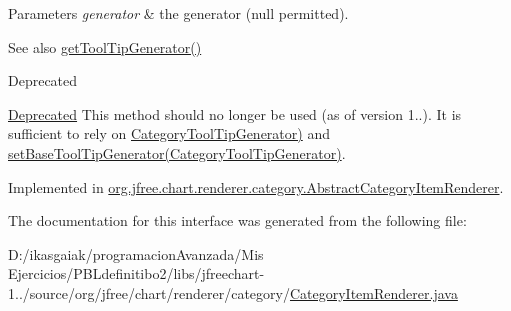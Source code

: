 \begin{DoxyParams}{Parameters}
{\em generator} & the generator ({\ttfamily null} permitted).\\
\hline
\end{DoxyParams}
\begin{DoxySeeAlso}{See also}
\mbox{\hyperlink{interfaceorg_1_1jfree_1_1chart_1_1renderer_1_1category_1_1_category_item_renderer_a887b874ffbaafb55216058196012b320}{get\+Tool\+Tip\+Generator()}}
\end{DoxySeeAlso}
\begin{DoxyRefDesc}{Deprecated}
\item[\mbox{\hyperlink{deprecated__deprecated000169}{Deprecated}}]This method should no longer be used (as of version 1..). It is sufficient to rely on \mbox{\hyperlink{}{Category\+Tool\+Tip\+Generator)}} and \mbox{\hyperlink{interfaceorg_1_1jfree_1_1chart_1_1renderer_1_1category_1_1_category_item_renderer_a8278a41153ebf3551e122550476ab646}{set\+Base\+Tool\+Tip\+Generator(\+Category\+Tool\+Tip\+Generator)}}. \end{DoxyRefDesc}


Implemented in \mbox{\hyperlink{classorg_1_1jfree_1_1chart_1_1renderer_1_1category_1_1_abstract_category_item_renderer_a19ad9dfc587403a06c97595c3f28800a}{org.\+jfree.\+chart.\+renderer.\+category.\+Abstract\+Category\+Item\+Renderer}}.



The documentation for this interface was generated from the following file\+:\begin{DoxyCompactItemize}
\item 
D\+:/ikasgaiak/programacion\+Avanzada/\+Mis Ejercicios/\+P\+B\+Ldefinitibo2/libs/jfreechart-\/1../source/org/jfree/chart/renderer/category/\mbox{\hyperlink{_category_item_renderer_8java}{Category\+Item\+Renderer.\+java}}\end{DoxyCompactItemize}
